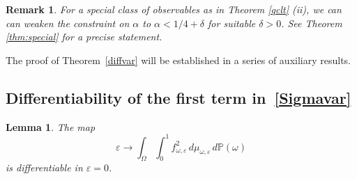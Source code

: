 \documentclass[12pt,reqno,a4paper]{article}
\newtheorem{lemma}[theorem]{Lemma}
\newtheorem{remark}[theorem]{Remark}
\begin{document}
\begin{remark}
	For a special class of observables as in 
	Theorem \ref{qclt} (ii), we can can weaken the constraint on 
	$\alpha$ to $\alpha < 1/4 + \delta$ for suitable $\delta > 0$.
	See Theorem \ref{thm:special} for a precise statement.
\end{remark}


The proof of Theorem~\ref{diffvar} will be established in a series of auxiliary results.  
\subsection{Differentiability of the first term in~\eqref{Sigmavar}}
\begin{lemma}
	The map
	\begin{equation}\label{6:05}
		\varepsilon \to \int_\Omega \int_0^1f_{\omega, \varepsilon}^2 \, d\mu_{\omega, \varepsilon}\, d\mathbb P(\omega)
	\end{equation}
	is differentiable in $\varepsilon=0$.
\end{lemma}
\end{document}
